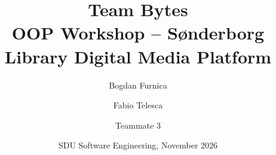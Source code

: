 \documentclass[11pt,a4paper]{article}
\title{Team Bytes\\\large OOP Workshop -- S{\o}nderborg Library Digital Media Platform}
\author{Bogdan Furnica \and Fabio Telesca \and Teammate 3}
\date{SDU Software Engineering, November 2026}
\begin{document}
\maketitle
\tableofcontents



\FloatBarrier


\end{document}
